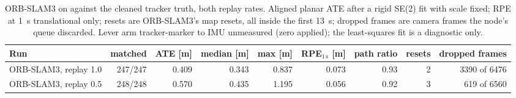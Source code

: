 \begin{table}[htbp]
\centering
\small
\caption[Realv6: ORB-SLAM3 against the cleaned tracker truth.]{ORB-SLAM3 on  against the cleaned tracker truth, both replay rates. Aligned planar ATE after a rigid SE(2) fit with scale fixed; RPE at \SI{1}{\second} translational only; resets are ORB-SLAM3's  map resets, all inside the first \SI{13}{\second}; dropped frames are camera frames the node's queue discarded. Lever arm tracker-marker to IMU unmeasured (zero applied); the least-squares fit is a diagnostic only.}
\label{tab:realv6-orb}
\scriptsize\setlength{\tabcolsep}{3pt}
\begin{tabular}{lrrrrrrrr}
\toprule
Run & matched & ATE [m] & median [m] & max [m] & RPE$_{1\,\mathrm{s}}$ [m] & path ratio & resets & dropped frames \\
\midrule
ORB-SLAM3, replay 1.0 & 247/247 & 0.409 & 0.343 & 0.837 & 0.073 & 0.93 & 2 & 3390 of 6476 \\
ORB-SLAM3, replay 0.5 & 248/248 & 0.570 & 0.435 & 1.195 & 0.056 & 0.92 & 3 & 619 of 6560 \\
\bottomrule
\end{tabular}
\end{table}
